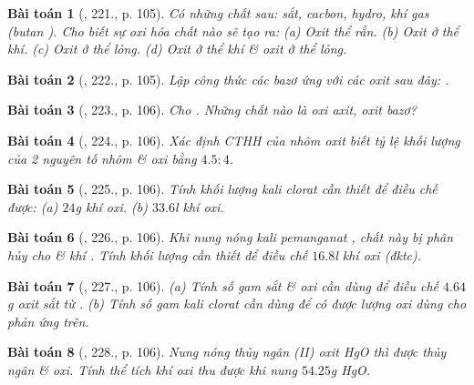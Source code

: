 \documentclass{article}
\newtheorem{baitoan}{Bài toán}
\begin{document}
\begin{baitoan}[\cite{An_400_BT_Hoa_Hoc_8_2020}, 221., p. 105]
	Có những chất sau: sắt, cacbon, hydro, khí gas (butan \emph{}). Cho biết sự oxi hóa chất nào sẽ tạo ra: (a) Oxit thể rắn. (b) Oxit ở thể khí. (c) Oxit ở thể lỏng. (d) Oxit ở thể khí \& oxit ở thể lỏng.
\end{baitoan}

\begin{baitoan}[\cite{An_400_BT_Hoa_Hoc_8_2020}, 222., p. 105]
	Lập công thức các bazơ ứng với các oxit sau đây: \emph{}.
\end{baitoan}

\begin{baitoan}[\cite{An_400_BT_Hoa_Hoc_8_2020}, 223., p. 106]
	Cho \emph{}. Những chất nào là oxi axit, oxit bazơ?
\end{baitoan}

\begin{baitoan}[\cite{An_400_BT_Hoa_Hoc_8_2020}, 224., p. 106]
	Xác định CTHH của nhôm oxit biết tỷ lệ khối lượng của 2 nguyên tố nhôm \& oxi bằng $4.5:4$.
\end{baitoan}

\begin{baitoan}[\cite{An_400_BT_Hoa_Hoc_8_2020}, 225., p. 106]
	Tính khối lượng kali clorat cần thiết để điều chế được: (a) $24$\emph{g} khí oxi. (b) $33.6$\emph{l} khí oxi.
\end{baitoan}

\begin{baitoan}[\cite{An_400_BT_Hoa_Hoc_8_2020}, 226., p. 106]
	Khi nung nóng kali pemanganat \emph{}, chất này bị phân hủy cho \emph{} \& khí \emph{}. Tính khối lượng \emph{} cần thiết để điều chế $16.8$\emph{l} khí oxi (đktc). 
\end{baitoan}

\begin{baitoan}[\cite{An_400_BT_Hoa_Hoc_8_2020}, 227., p. 106]
	(a) Tính số gam sắt \& oxi cần dùng để điều chế $4.64$\emph{g} oxit sắt từ \emph{}. (b) Tính số gam kali clorat \emph{} cần dùng để có được lượng oxi dùng cho phản ứng trên.
\end{baitoan}

\begin{baitoan}[\cite{An_400_BT_Hoa_Hoc_8_2020}, 228., p. 106]
	Nung nóng thủy ngân (II) oxit \emph{HgO} thì được thủy ngân \& oxi. Tính thể tích khí oxi thu được khi nung $54.25$\emph{g} \emph{HgO}.
\end{baitoan}
\end{document}
